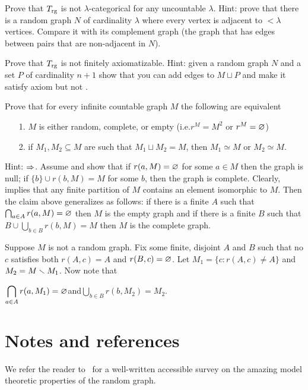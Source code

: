 \begin{exercise}
Prove that $T_{\rm rg}$ is not $\lambda$-categorical for any uncountable $\lambda$.
Hint: prove that there is a random graph $N$ of cardinality $\lambda$ where every vertex is adjacent to $<\lambda$ vertices.
Compare it with its complement graph (the graph that has edges between pairs that are non-adjacent in $N$).
\end{exercise}

\begin{exercise}
Prove that $T_{\rm rg}$ is not finitely axiomatizable.
Hint: given a random graph $N$ and a set $P$ of cardinality $n+1$ show that you can add edges to $M\sqcup P$ and make it satisfy axiom  but not .
\end{exercise}

\begin{exercise}\label{ex_CameronRG}
Prove that for every infinite countable graph $M$ the following are equivalent
\begin{itemize}
\item[1.] $M$ is either random, complete, or empty (i.e.\@ $r^M=M^2$ or $r^M=\varnothing$)
\item[2.] if $M_1,M_2\subseteq M$ are such that $M_1\sqcup M_2=M$, then $M_1\simeq M$ or $M_2\simeq M$.
\end{itemize}
Hint: $\Rightarrow$. Assume  and show that if $r(a,M)=\varnothing$ for some $a\in M$ then the graph is null; if $\{b\}\cup r(b,M)=M$ for some $b$, then the graph is complete.
Clearly,  implies that any finite partition of $M$ contains an element isomorphic to $M$.
Then the claim above generalizes as follows: if there is a finite $A$ such that $\bigcap_{a\in A}r(a, M)=\varnothing$ then $M$ is the empty graph and if there is a finite $B$ such that $B\cup\bigcup_{b\in B}r(b,M)=M$ then $M$ is the complete graph.

Suppose $M$ is not a random graph.
Fix some finite, disjoint $A$ and $B$ such that no $c$ satisfies both $r(A,c)= A$ and $r(B,c)=\varnothing$.
Let $M_1=\{c:r(A,c)\neq A\}$ and $M_2=M\smallsetminus M_1$.
Now note that 

\hfil$\displaystyle\bigcap_{a\in A}r(a, M_1)=\varnothing$\hfil and\hfil $\displaystyle\bigcup_{b\in B}r(b, M_2)=M_2$.
\end{exercise}

\section{Notes and references}

We refer the reader to~\cite{Cameron} for a well-written accessible survey on the amazing model theoretic properties of the random graph.

\begin{biblist}[]\normalsize
\end{biblist}
